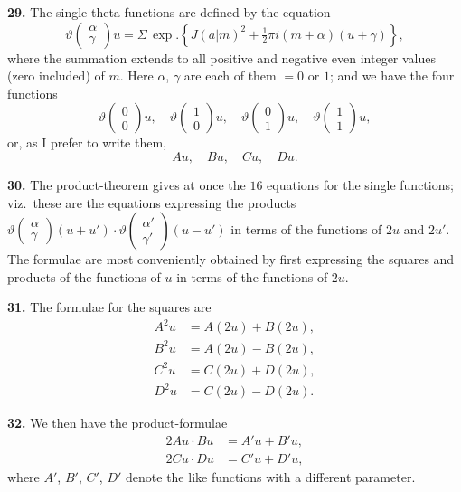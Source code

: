 \documentclass[12pt,a4paper]{article}
\newcommand{\cbtw}{\vert}  %
\theoremstyle{definition}
\begin{document}
\noindent\textbf{29.}\quad
The single theta-functions are defined by the equation
\[
\vartheta\begin{pmatrix} \alpha \\ \gamma \end{pmatrix}u = \Sigma\, \exp.\left\{J(a\cbtw m)^2 + \tfrac{1}{2}\pi i(m + \alpha)(u + \gamma)\right\},
\]
where the summation extends to all positive and negative even integer values (zero included) of $m$. Here $\alpha$, $\gamma$ are each of them $= 0$ or $1$; and we have the four functions
\[
\vartheta\begin{pmatrix} 0 \\ 0 \end{pmatrix}u,\quad
\vartheta\begin{pmatrix} 1 \\ 0 \end{pmatrix}u,\quad
\vartheta\begin{pmatrix} 0 \\ 1 \end{pmatrix}u,\quad
\vartheta\begin{pmatrix} 1 \\ 1 \end{pmatrix}u,
\]
or, as I prefer to write them,
\[
Au,\quad Bu,\quad Cu,\quad Du.
\]

\noindent\textbf{30.}\quad
The product-theorem gives at once the $16$ equations for the single functions; viz.\ these are the equations expressing the products $\vartheta\begin{pmatrix} \alpha \\ \gamma \end{pmatrix}(u + u') \cdot \vartheta\begin{pmatrix} \alpha' \\ \gamma' \end{pmatrix}(u - u')$ in terms of the functions of $2u$ and $2u'$. The formulae are most conveniently obtained by first expressing the squares and products of the functions of $u$ in terms of the functions of $2u$.

\noindent\textbf{31.}\quad
The formulae for the squares are
\begin{align*}
A^2 u &= A(2u) + B(2u), \\
B^2 u &= A(2u) - B(2u), \\
C^2 u &= C(2u) + D(2u), \\
D^2 u &= C(2u) - D(2u).
\end{align*}

\noindent\textbf{32.}\quad
We then have the product-formulae
\begin{align*}
2Au \cdot Bu &= A'u + B'u, \\
2Cu \cdot Du &= C'u + D'u,
\end{align*}
where $A'$, $B'$, $C'$, $D'$ denote the like functions with a different parameter.
\end{document}
